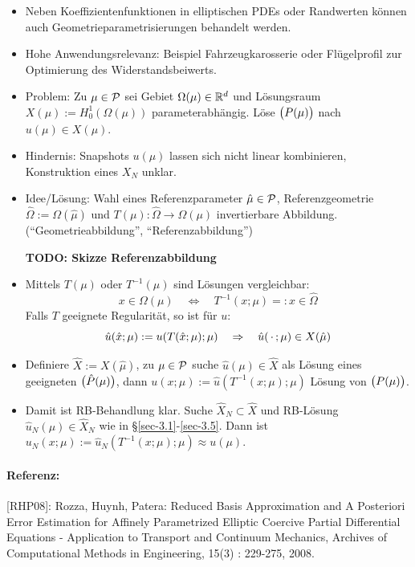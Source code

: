 \begin{itemize}
	\item Neben Koeffizientenfunktionen in elliptischen PDEs oder Randwerten können auch Geometrieparametrisierungen behandelt werden.
	\item Hohe Anwendungsrelevanz: Beispiel Fahrzeugkarosserie oder Flügelprofil zur Optimierung des Widerstandsbeiwerts.
	\item Problem: Zu $\mu \in \mathcal{P}$ sei Gebiet $\Omega(\mu) \in \mathbb{R}^d$ und Lösungsraum $X(\mu) := H_0^1(\Omega(\mu))$ parameterabhängig. Löse $\big(P(\mu)\big)$ nach $u(\mu) \in X(\mu)$.
	\item Hindernis: Snapshots $u(\mu)$ lassen sich nicht linear kombinieren, Konstruktion eines $X_N$ unklar.
	\item Idee/Lösung: Wahl eines Referenzparameter $\hat\mu \in \mathcal{P}$, Referenzgeometrie $\hat\Omega := \Omega(\hat\mu)$ und $T(\mu) : \hat\Omega \to \Omega(\mu)$ invertierbare Abbildung. (``Geometrieabbildung'', ``Referenzabbildung'')

		{\large\bf TODO: Skizze Referenzabbildung}
	\item Mittels $T(\mu)$ oder $T^{-1}(\mu)$ sind Lösungen vergleichbar:
		\[
			x \in \Omega(\mu) \quad \Leftrightarrow \quad T^{-1}(x;\mu) =: \hat x \in \hat\Omega
		\]
		Falls $T$ geeignete Regularität, so ist für $u$:
		\[
			\hat u(\hat x; \mu) := u(T(\hat x;\mu);\mu) \quad \Rightarrow \quad \hat u(\,\cdot\,;\mu) \in X(\hat \mu)
		\]
	\item Definiere $\hat X := X(\hat \mu)$, zu $\mu \in \mathcal{P}$ suche $\hat u(\mu) \in \hat X$ als Lösung eines geeigneten $\big(\hat P(\mu)\big)$, dann $u(x;\mu) := \hat u(T^{-1}(x;\mu);\mu)$ Lösung von $\big(P(\mu)\big)$.
	\item Damit ist RB-Behandlung klar.
		Suche $\hat X_N \subset \hat X$ und RB-Lösung $\hat u_N(\mu) \in \hat X_N$ wie in §\ref{sec-3.1}-\ref{sec-3.5}.
		Dann ist $u_N(x;\mu) := \hat u_N(T^{-1}(x;\mu);\mu) \approx u(\mu)$.
\end{itemize}

\paragraph{Referenz:} [RHP08]: Rozza, Huynh, Patera: Reduced Basis Approximation and A Posteriori Error Estimation for Affinely Parametrized Elliptic Coercive Partial Differential Equations - Application to Transport and Continuum Mechanics, Archives of Computational Methods in Engineering, 15(3) : 229-275, 2008.

